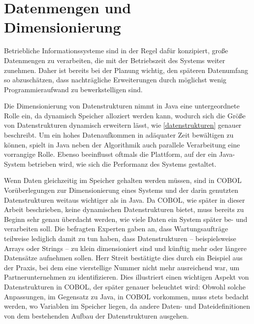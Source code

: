 \section{Datenmengen und Dimensionierung}

Betriebliche Informationssysteme sind in der Regel dafür konzipiert, große Datenmengen zu verarbeiten, die \idR mit der Betriebszeit des Systems weiter zunehmen. Daher ist bereits bei der Planung wichtig, den späteren Datenumfang so abzuschätzen, dass nachträgliche Erweiterungen durch möglichst wenig Programmieraufwand zu bewerkstelligen sind.

Die Dimensionierung von Datenstrukturen nimmt in Java eine untergeordnete Rolle ein, da dynamisch Speicher alloziert werden kann, wodurch sich die Größe von Datenstrukturen dynamisch erweitern lässt, wie \autoref{datenstrukturen} genauer beschreibt. Um ein hohes Datenaufkommen in adäquater Zeit bewältigen zu können, spielt in Java neben der Algorithmik auch parallele Verarbeitung eine vorrangige Rolle. Ebenso beeinflusst oftmals die Plattform, auf der ein Java-System betrieben wird, wie sich die Performanz des Systems gestaltet.

Wenn Daten gleichzeitig im Speicher gehalten werden müssen, sind in COBOL Vorüberlegungen zur Dimensionierung eines Systems und der darin genutzten Datenstrukturen weitaus wichtiger als in Java. Da COBOL, wie später in dieser Arbeit beschrieben, keine dynamischen Datenstrukturen bietet, muss bereits zu Beginn sehr genau überdacht werden, wie viele Daten ein System später be- und verarbeiten soll. Die befragten Experten gaben an, dass Wartungsaufträge teilweise lediglich damit zu tun haben, dass Datenstrukturen -- beispielsweise Arrays oder Strings -- zu klein dimensioniert sind und künftig mehr oder längere Datensätze aufnehmen sollen. Herr Streit bestätigte dies durch ein Beispiel aus der Praxis, bei dem eine vierstellige Nummer nicht mehr ausreichend war, um Partnerunternehmen zu identifizieren.  Dies illustriert einen wichtigen Aspekt von Datenstrukturen in COBOL, der später genauer beleuchtet wird: Obwohl solche Anpassungen, im Gegensatz zu Java, in COBOL vorkommen, muss stets bedacht werden, wo Variablen im Speicher liegen, da andere Daten- und Dateidefinitionen von dem bestehenden Aufbau der Datenstrukturen ausgehen.